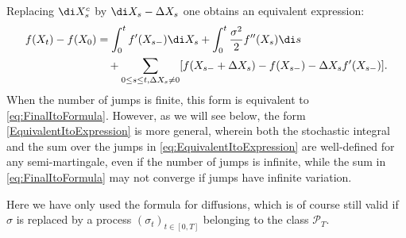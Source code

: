 \begin{xattention}{}
	Replacing \(\di X_s^c\) by \(\di X_s - \Delta X_s\) one obtains an equivalent expression:
	\begin{equation} \label{eq:EquivalentItoExpression}
		\begin{split}
			f(X_t) - f(X_0) & = \int_0^t f'(X_{s-}) \di X_s + \int_0^t \frac{\sigma^2}{2} f''(X_s) \di s                                    \\
			                & \quad + \sum_{0 \le s \le t, \Delta X_s \neq 0} [f(X_{s-} + \Delta X_s) - f(X_{s-}) - \Delta X_s f'(X_{s-})].
		\end{split}
	\end{equation}
	When the number of jumps is finite, this form is equivalent to \cref{eq:FinalItoFormula}. However, as we will see below, the form \cref{EquivalentItoExpression} is more general, wherein both the stochastic integral and the sum over the jumps in \cref{eq:EquivalentItoExpression} are well-defined for any semi-martingale, even if the number of jumps is infinite, while the sum in \cref{eq:FinalItoFormula} may not converge if jumps have infinite variation.

	Here we have only used the \Ito{} formula for diffusions, which is of course still valid if \(\sigma\) is replaced by a process \((\sigma_t)_{t \in [0,T]}\) belonging to the class \(\mathcal{P}_T\).
\end{xattention}

